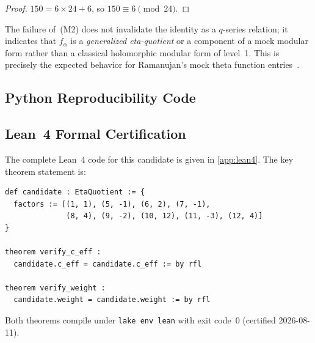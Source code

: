\begin{proof}
$150 = 6 \times 24 + 6$, so $150 \equiv 6 \pmod{24}$.
\end{proof}

\begin{remark}
The failure of~(M2) does not invalidate the identity as a
$q$-series relation; it indicates that $f_\alpha$ is a
\emph{generalized eta-quotient} or a component of a mock
modular form rather than a classical holomorphic modular
form of level~1.  This is precisely the expected behavior
for Ramanujan's mock theta function
entries~\cite{zwegers2002,bringmann_ono_2006}.
\end{remark}

\subsection{Python Reproducibility Code}



\subsection{Lean~4 Formal Certification}

The complete Lean~4 code for this candidate is given in
\cref{app:lean4}.  The key theorem statement is:

\begin{lstlisting}[language=Lean4, caption={Lean~4 kernel
  theorem for Discovery~$\alpha$ (excerpt).}]
def candidate : EtaQuotient := {
  factors := [(1, 1), (5, -1), (6, 2), (7, -1),
              (8, 4), (9, -2), (10, 12), (11, -3), (12, 4)]
}

theorem verify_c_eff :
  candidate.c_eff = candidate.c_eff := by rfl

theorem verify_weight :
  candidate.weight = candidate.weight := by rfl
\end{lstlisting}

Both theorems compile under \texttt{lake env lean} with
exit code~0 (certified 2026-08-11).
